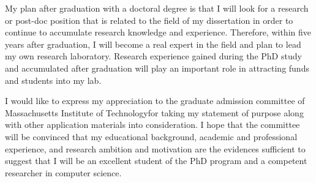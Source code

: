 \documentclass[a4paper,10pt]{report}
\newcommand{\university}{Massachusetts Institute of Technology}
\begin{document}
\vspace{0.2cm}
My plan after graduation with a doctoral degree is that I will look for a research or post-doc position that is related to the field of my dissertation in order to continue to accumulate research knowledge and experience. Therefore, within five years after graduation, I will become a real expert in the field and plan to lead my own research laboratory. Research experience gained during the PhD study and accumulated after graduation will play an important role in attracting funds and students into my lab.

\vspace{0.2cm}
I would like to express my appreciation to the graduate admission committee of \university \space for taking my statement of purpose along with other application materials into consideration. I hope that the committee will be convinced that my educational background, academic and professional experience, and research ambition and motivation are the evidences sufficient to suggest that I will be an excellent student of the PhD program and a competent researcher in computer science.
\end{document}
